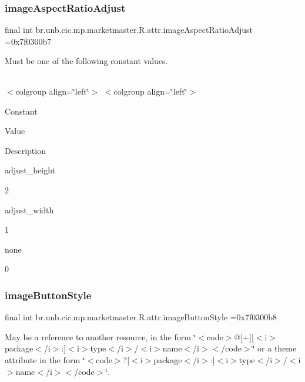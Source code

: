 \subsubsection{\texorpdfstring{image\+Aspect\+Ratio\+Adjust}{imageAspectRatioAdjust}}
{\footnotesize\ttfamily final int br.\+unb.\+cic.\+mp.\+marketmaster.\+R.\+attr.\+image\+Aspect\+Ratio\+Adjust =0x7f0300b7\hspace{0.3cm}{\ttfamily [static]}}

Must be one of the following constant values.

\tabulinesep=1mm
\begin{longtabu} spread 0pt [c]{*{0}{|X[-1]}|}
\hline
\end{longtabu}
$<$colgroup align=\char`\"{}left\char`\"{}$>$ $<$colgroup align=\char`\"{}left\char`\"{}$>$ 

Constant

Value

Description 

adjust\+\_\+height

2

adjust\+\_\+width

1

none

0\mbox{\label{classbr_1_1unb_1_1cic_1_1mp_1_1marketmaster_1_1R_1_1attr_a0bba1c013e1ac41b5ac46687da2f802e}} 
\subsubsection{\texorpdfstring{image\+Button\+Style}{imageButtonStyle}}
{\footnotesize\ttfamily final int br.\+unb.\+cic.\+mp.\+marketmaster.\+R.\+attr.\+image\+Button\+Style =0x7f0300b8\hspace{0.3cm}{\ttfamily [static]}}

May be a reference to another resource, in the form \char`\"{}$<$code$>$@\mbox{[}+\mbox{]}\mbox{[}$<$i$>$package$<$/i$>$\+:\mbox{]}$<$i$>$type$<$/i$>$/$<$i$>$name$<$/i$>$$<$/code$>$\char`\"{} or a theme attribute in the form \char`\"{}$<$code$>$?\mbox{[}$<$i$>$package$<$/i$>$\+:\mbox{]}$<$i$>$type$<$/i$>$/$<$i$>$name$<$/i$>$$<$/code$>$\char`\"{}. \mbox{\label{classbr_1_1unb_1_1cic_1_1mp_1_1marketmaster_1_1R_1_1attr_a274c428ed2c93647221ed69c643f8c23}} 
